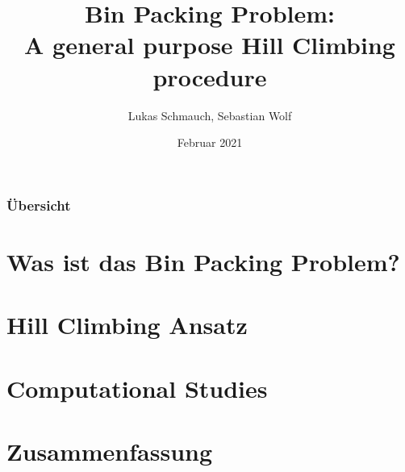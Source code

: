 \documentclass{beamer}
\title[BPP]{Bin Packing Problem:\\ A general purpose Hill Climbing procedure } %
\institute[FSU-Jena] %
{ 
Seminar Modern Heuristics \\
Dr. Rico Walter
}
\author{Lukas Schmauch, Sebastian Wolf}
\date{Februar 2021} %
\begin{document}
\begin{frame}
\titlepage %
\end{frame}
\begin{frame}
\frametitle{Übersicht} 
\tableofcontents
\section{Was ist das Bin Packing Problem?} 
\section{Hill Climbing Ansatz} 
\section{Computational Studies}
\section{Zusammenfassung} 
\end{frame}
\end{document}
